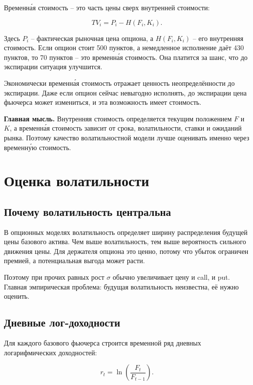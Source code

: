 \documentclass[11pt,a4paper]{article}
\newcommand{\key}[1]{%
  \vspace{0.15em}
  \noindent\colorbox{softblue}{%
    \parbox{\dimexpr\linewidth-2\fboxsep\relax}{\textbf{Главная мысль.} #1}%
  }\vspace{0.2em}
}
\begin{document}
Временна́я стоимость -- это часть цены сверх внутренней стоимости:

\begin{equation}
TV_i = P_i - H(F_i,K_i).
\end{equation}

Здесь $P_i$ -- фактическая рыночная цена опциона, а $H(F_i,K_i)$ -- его внутренняя стоимость. Если опцион стоит 500 пунктов, а немедленное исполнение даёт 430 пунктов, то 70 пунктов -- это временна́я стоимость. Она платится за шанс, что до экспирации ситуация улучшится.

Экономически временна́я стоимость отражает ценность неопределённости до экспирации. Даже если опцион сейчас невыгодно исполнять, до экспирации цена фьючерса может измениться, и эта возможность имеет стоимость.

\key{Внутренняя стоимость определяется текущим положением $F$ и $K$, а временна́я стоимость зависит от срока, волатильности, ставки и ожиданий рынка. Поэтому качество волатильностной модели лучше оценивать именно через временну́ю стоимость.}

\section{Оценка волатильности}

\subsection{Почему волатильность центральна}

В опционных моделях волатильность определяет ширину распределения будущей цены базового актива. Чем выше волатильность, тем выше вероятность сильного движения цены. Для держателя опциона это ценно, потому что убыток ограничен премией, а потенциальная выгода может расти.

Поэтому при прочих равных рост $\sigma$ обычно увеличивает цену и call, и put. Главная эмпирическая проблема: будущая волатильность неизвестна, её нужно оценить.

\subsection{Дневные лог-доходности}

Для каждого базового фьючерса строится временной ряд дневных логарифмических доходностей:

\begin{equation}
r_t = \ln\left(\frac{F_t}{F_{t-1}}\right).
\end{equation}
\end{document}
